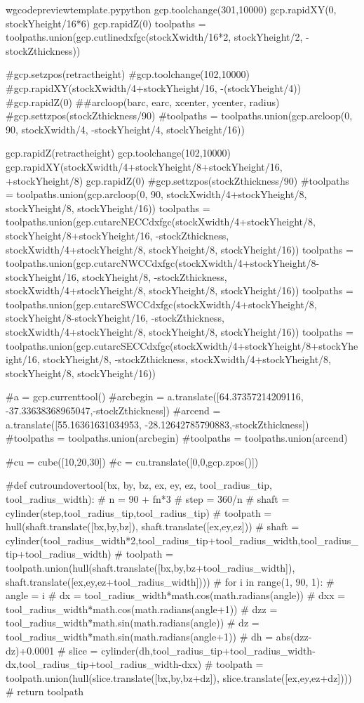 \documentclass{ltxdoc}
\begin{document}
\begin{writecode}{w}{gcodepreviewtemplate.py}{python}
gcp.toolchange(301,10000)
gcp.rapidXY(0, stockYheight/16*6)
gcp.rapidZ(0)
toolpaths = toolpaths.union(gcp.cutlinedxfgc(stockXwidth/16*2, stockYheight/2, -stockZthickness))

#gcp.setzpos(retractheight)
#gcp.toolchange(102,10000)
#gcp.rapidXY(stockXwidth/4+stockYheight/16, -(stockYheight/4))
#gcp.rapidZ(0)
##arcloop(barc, earc, xcenter, ycenter, radius)
#gcp.settzpos(stockZthickness/90)
#toolpaths = toolpaths.union(gcp.arcloop(0, 90, stockXwidth/4, -stockYheight/4, stockYheight/16))

gcp.rapidZ(retractheight)
gcp.toolchange(102,10000)
gcp.rapidXY(stockXwidth/4+stockYheight/8+stockYheight/16, +stockYheight/8)
gcp.rapidZ(0)
#gcp.settzpos(stockZthickness/90)
#toolpaths = toolpaths.union(gcp.arcloop(0, 90, stockXwidth/4+stockYheight/8, stockYheight/8, stockYheight/16))
toolpaths = toolpaths.union(gcp.cutarcNECCdxfgc(stockXwidth/4+stockYheight/8, stockYheight/8+stockYheight/16, -stockZthickness, stockXwidth/4+stockYheight/8, stockYheight/8, stockYheight/16))
toolpaths = toolpaths.union(gcp.cutarcNWCCdxfgc(stockXwidth/4+stockYheight/8-stockYheight/16, stockYheight/8, -stockZthickness, stockXwidth/4+stockYheight/8, stockYheight/8, stockYheight/16))
toolpaths = toolpaths.union(gcp.cutarcSWCCdxfgc(stockXwidth/4+stockYheight/8, stockYheight/8-stockYheight/16, -stockZthickness, stockXwidth/4+stockYheight/8, stockYheight/8, stockYheight/16))
toolpaths = toolpaths.union(gcp.cutarcSECCdxfgc(stockXwidth/4+stockYheight/8+stockYheight/16, stockYheight/8, -stockZthickness, stockXwidth/4+stockYheight/8, stockYheight/8, stockYheight/16))

#a = gcp.currenttool()
#arcbegin = a.translate([64.37357214209116, -37.33638368965047,-stockZthickness])
#arcend = a.translate([55.16361631034953, -28.12642785790883,-stockZthickness])
#toolpaths = toolpaths.union(arcbegin)
#toolpaths = toolpaths.union(arcend)

#cu = cube([10,20,30])
#c = cu.translate([0,0,gcp.zpos()])

#def cutroundovertool(bx, by, bz, ex, ey, ez, tool_radius_tip, tool_radius_width):
#    n = 90 + fn*3
#    step = 360/n
#    shaft = cylinder(step,tool_radius_tip,tool_radius_tip)
#    toolpath = hull(shaft.translate([bx,by,bz]), shaft.translate([ex,ey,ez]))
#    shaft = cylinder(tool_radius_width*2,tool_radius_tip+tool_radius_width,tool_radius_tip+tool_radius_width)
#    toolpath = toolpath.union(hull(shaft.translate([bx,by,bz+tool_radius_width]), shaft.translate([ex,ey,ez+tool_radius_width])))
#    for i in range(1, 90, 1):
#        angle = i
#        dx = tool_radius_width*math.cos(math.radians(angle))
#        dxx = tool_radius_width*math.cos(math.radians(angle+1))
#        dzz = tool_radius_width*math.sin(math.radians(angle))
#        dz = tool_radius_width*math.sin(math.radians(angle+1))
#        dh = abs(dzz-dz)+0.0001
#        slice = cylinder(dh,tool_radius_tip+tool_radius_width-dx,tool_radius_tip+tool_radius_width-dxx)
#        toolpath = toolpath.union(hull(slice.translate([bx,by,bz+dz]), slice.translate([ex,ey,ez+dz])))
#    return toolpath


\end{writecode}
\end{document}
